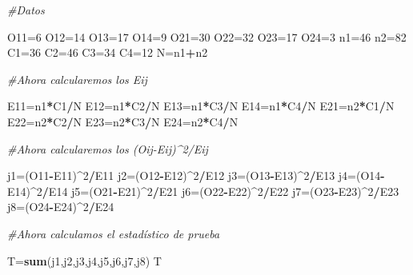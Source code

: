 \documentclass[
  a4paper,
  oneside,
  openany]{book}
\newenvironment{Shaded}{\begin{snugshade}}{\end{snugshade}}
\newcommand{\CommentTok}[1]{\textcolor[rgb]{0.56,0.35,0.01}{\textit{#1}}}
\newcommand{\DecValTok}[1]{\textcolor[rgb]{0.00,0.00,0.81}{#1}}
\newcommand{\KeywordTok}[1]{\textcolor[rgb]{0.13,0.29,0.53}{\textbf{#1}}}
\newcommand{\NormalTok}[1]{#1}
\newcommand{\OperatorTok}[1]{\textcolor[rgb]{0.81,0.36,0.00}{\textbf{#1}}}
\begin{document}
\begin{Shaded}
\begin{Highlighting}[]
\CommentTok{\#Datos}

\NormalTok{O11=}\DecValTok{6}
\NormalTok{O12=}\DecValTok{14}
\NormalTok{O13=}\DecValTok{17}
\NormalTok{O14=}\DecValTok{9}
\NormalTok{O21=}\DecValTok{30}
\NormalTok{O22=}\DecValTok{32}
\NormalTok{O23=}\DecValTok{17}
\NormalTok{O24=}\DecValTok{3}
\NormalTok{n1=}\DecValTok{46}
\NormalTok{n2=}\DecValTok{82}
\NormalTok{C1=}\DecValTok{36}
\NormalTok{C2=}\DecValTok{46}
\NormalTok{C3=}\DecValTok{34}
\NormalTok{C4=}\DecValTok{12}
\NormalTok{N=n1}\OperatorTok{+}\NormalTok{n2}

\CommentTok{\#Ahora calcularemos los Eij}

\NormalTok{E11=n1}\OperatorTok{*}\NormalTok{C1}\OperatorTok{/}\NormalTok{N}
\NormalTok{E12=n1}\OperatorTok{*}\NormalTok{C2}\OperatorTok{/}\NormalTok{N}
\NormalTok{E13=n1}\OperatorTok{*}\NormalTok{C3}\OperatorTok{/}\NormalTok{N}
\NormalTok{E14=n1}\OperatorTok{*}\NormalTok{C4}\OperatorTok{/}\NormalTok{N}
\NormalTok{E21=n2}\OperatorTok{*}\NormalTok{C1}\OperatorTok{/}\NormalTok{N}
\NormalTok{E22=n2}\OperatorTok{*}\NormalTok{C2}\OperatorTok{/}\NormalTok{N}
\NormalTok{E23=n2}\OperatorTok{*}\NormalTok{C3}\OperatorTok{/}\NormalTok{N}
\NormalTok{E24=n2}\OperatorTok{*}\NormalTok{C4}\OperatorTok{/}\NormalTok{N}

\CommentTok{\#Ahora calcularemos los (Oij{-}Eij)\^{}2/Eij}

\NormalTok{j1=(O11}\OperatorTok{{-}}\NormalTok{E11)}\OperatorTok{\^{}}\DecValTok{2}\OperatorTok{/}\NormalTok{E11}
\NormalTok{j2=(O12}\OperatorTok{{-}}\NormalTok{E12)}\OperatorTok{\^{}}\DecValTok{2}\OperatorTok{/}\NormalTok{E12}
\NormalTok{j3=(O13}\OperatorTok{{-}}\NormalTok{E13)}\OperatorTok{\^{}}\DecValTok{2}\OperatorTok{/}\NormalTok{E13}
\NormalTok{j4=(O14}\OperatorTok{{-}}\NormalTok{E14)}\OperatorTok{\^{}}\DecValTok{2}\OperatorTok{/}\NormalTok{E14}
\NormalTok{j5=(O21}\OperatorTok{{-}}\NormalTok{E21)}\OperatorTok{\^{}}\DecValTok{2}\OperatorTok{/}\NormalTok{E21}
\NormalTok{j6=(O22}\OperatorTok{{-}}\NormalTok{E22)}\OperatorTok{\^{}}\DecValTok{2}\OperatorTok{/}\NormalTok{E22}
\NormalTok{j7=(O23}\OperatorTok{{-}}\NormalTok{E23)}\OperatorTok{\^{}}\DecValTok{2}\OperatorTok{/}\NormalTok{E23}
\NormalTok{j8=(O24}\OperatorTok{{-}}\NormalTok{E24)}\OperatorTok{\^{}}\DecValTok{2}\OperatorTok{/}\NormalTok{E24}

\CommentTok{\#Ahora calculamos el estadístico de prueba}

\NormalTok{T=}\KeywordTok{sum}\NormalTok{(j1,j2,j3,j4,j5,j6,j7,j8)}
\NormalTok{T}
\end{Highlighting}
\end{Shaded}
\end{document}
